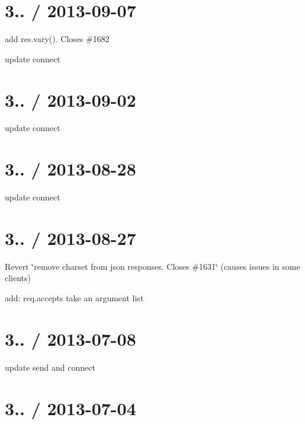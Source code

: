 \section*{3.. / 2013-\/09-\/07 }


\begin{DoxyItemize}
\item add res.\+vary(). Closes \#1682
\item update connect
\end{DoxyItemize}

\section*{3.. / 2013-\/09-\/02 }


\begin{DoxyItemize}
\item update connect
\end{DoxyItemize}

\section*{3.. / 2013-\/08-\/28 }


\begin{DoxyItemize}
\item update connect
\end{DoxyItemize}

\section*{3.. / 2013-\/08-\/27 }


\begin{DoxyItemize}
\item Revert \char`\"{}remove charset from json responses. Closes \#1631\char`\"{} (causes issues in some clients)
\item add\+: req.\+accepts take an argument list
\end{DoxyItemize}

\section*{3.. / 2013-\/07-\/08 }


\begin{DoxyItemize}
\item update send and connect
\end{DoxyItemize}

\section*{3.. / 2013-\/07-\/04 }


